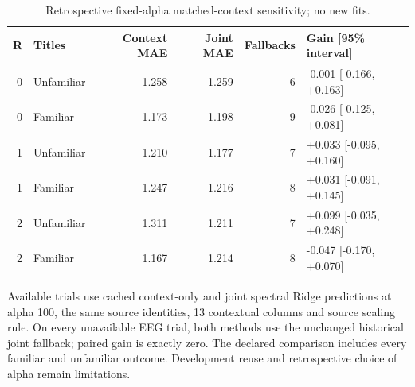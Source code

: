 \begin{table}[tbp]
\centering
\small
\caption{Retrospective fixed-alpha matched-context sensitivity; no new fits.}
\label{tab:matched}
\begin{tabular}{rlrrrl}
\toprule
R & Titles & Context MAE & Joint MAE & Fallbacks & Gain [95\% interval] \\
\midrule
0 & Unfamiliar & 1.258 & 1.259 & 6 & -0.001 [-0.166, +0.163] \\
0 & Familiar & 1.173 & 1.198 & 9 & -0.026 [-0.125, +0.081] \\
1 & Unfamiliar & 1.210 & 1.177 & 7 & +0.033 [-0.095, +0.160] \\
1 & Familiar & 1.247 & 1.216 & 8 & +0.031 [-0.091, +0.145] \\
2 & Unfamiliar & 1.311 & 1.211 & 7 & +0.099 [-0.035, +0.248] \\
2 & Familiar & 1.167 & 1.214 & 8 & -0.047 [-0.170, +0.070] \\
\bottomrule
\end{tabular}
\par\medskip\begin{minipage}{0.97\linewidth}\footnotesize Available trials use cached context-only and joint spectral Ridge predictions at alpha 100, the same source identities, 13 contextual columns and source scaling rule. On every unavailable EEG trial, both methods use the unchanged historical joint fallback; paired gain is exactly zero. The declared comparison includes every familiar and unfamiliar outcome. Development reuse and retrospective choice of alpha remain limitations.\end{minipage}
\end{table}
